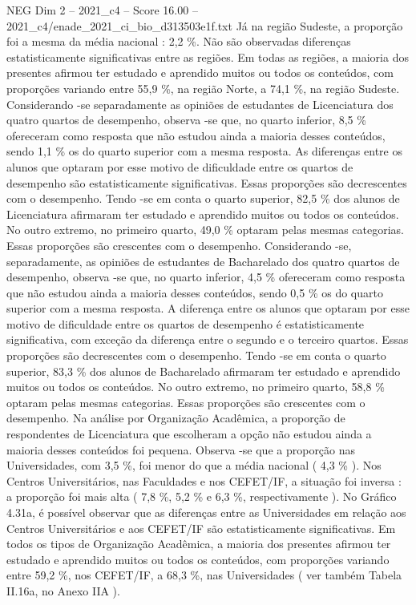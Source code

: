 \begin{textsample}{NEG Dim 2 – 2021\_c4 – Score 16.00 – 2021\_c4/enade\_2021\_ci\_bio\_d313503e1f.txt}
Já na região Sudeste, a proporção foi a mesma da média nacional : 2,2 \%.
Não são observadas diferenças estatisticamente significativas entre as regiões.
Em todas as regiões, a maioria dos presentes afirmou ter estudado e aprendido muitos ou todos os conteúdos, com proporções variando entre 55,9 \%, na região Norte, a 74,1 \%, na região Sudeste.
Considerando -se separadamente as opiniões de estudantes de Licenciatura dos quatro quartos de desempenho, observa -se que, no quarto inferior, 8,5 \% ofereceram como resposta que não estudou ainda a maioria desses conteúdos, sendo 1,1 \% os do quarto superior com a mesma resposta.
As diferenças entre os alunos que optaram por esse motivo de dificuldade entre os quartos de desempenho são estatisticamente significativas.
Essas proporções são decrescentes com o desempenho.
Tendo -se em conta o quarto superior, 82,5 \% dos alunos de Licenciatura afirmaram ter estudado e aprendido muitos ou todos os conteúdos.
No outro extremo, no primeiro quarto, 49,0 \% optaram pelas mesmas categorias.
Essas proporções são crescentes com o desempenho.
Considerando -se, separadamente, as opiniões de estudantes de Bacharelado dos quatro quartos de desempenho, observa -se que, no quarto inferior, 4,5 \% ofereceram como resposta que não estudou ainda a maioria desses conteúdos, sendo 0,5 \% os do quarto superior com a mesma resposta.
A diferença entre os alunos que optaram por esse motivo de dificuldade entre os quartos de desempenho é estatisticamente significativa, com exceção da diferença entre o segundo e o terceiro quartos.
Essas proporções são decrescentes com o desempenho.
Tendo -se em conta o quarto superior, 83,3 \% dos alunos de Bacharelado afirmaram ter estudado e aprendido muitos ou todos os conteúdos.
No outro extremo, no primeiro quarto, 58,8 \% optaram pelas mesmas categorias.
Essas proporções são crescentes com o desempenho.
Na análise por Organização Acadêmica, a proporção de respondentes de Licenciatura que escolheram a opção não estudou ainda a maioria desses conteúdos foi pequena.
Observa -se que a proporção nas Universidades, com 3,5 \%, foi menor do que a média nacional ( 4,3 \% ).
Nos Centros Universitários, nas Faculdades e nos CEFET/IF, a situação foi inversa : a proporção foi mais alta ( 7,8 \%, 5,2 \% e 6,3 \%, respectivamente ).
No Gráfico 4.31a, é possível observar que as diferenças entre as Universidades em relação aos Centros Universitários e aos CEFET/IF são estatisticamente significativas.
Em todos os tipos de Organização Acadêmica, a maioria dos presentes afirmou ter estudado e aprendido muitos ou todos os conteúdos, com proporções variando entre 59,2 \%, nos CEFET/IF, a 68,3 \%, nas Universidades ( ver também Tabela II.16a, no Anexo IIA ).

\end{textsample}
